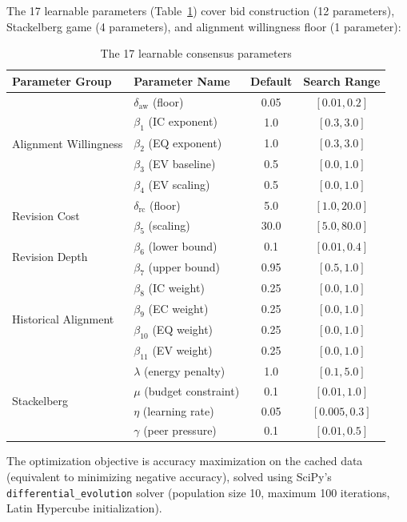 \documentclass[12pt,a4paper]{article}
\begin{document}
The 17 learnable parameters (Table~\ref{tab:params}) cover bid construction (12 parameters), Stackelberg game (4 parameters), and alignment willingness floor (1 parameter):

\begin{table}[H]
\centering
\caption{The 17 learnable consensus parameters}\label{tab:params}
\begin{tabular}{llcc}
\toprule
Parameter Group & Parameter Name & Default & Search Range \\
\midrule
\multirow{5}{*}{Alignment Willingness} & $\delta_{\text{aw}}$ (floor) & 0.05 & $[0.01, 0.2]$ \\
& $\beta_1$ (IC exponent) & 1.0 & $[0.3, 3.0]$ \\
& $\beta_2$ (EQ exponent) & 1.0 & $[0.3, 3.0]$ \\
& $\beta_3$ (EV baseline) & 0.5 & $[0.0, 1.0]$ \\
& $\beta_4$ (EV scaling) & 0.5 & $[0.0, 1.0]$ \\
\midrule
\multirow{2}{*}{Revision Cost} & $\delta_{\text{rc}}$ (floor) & 5.0 & $[1.0, 20.0]$ \\
& $\beta_5$ (scaling) & 30.0 & $[5.0, 80.0]$ \\
\midrule
\multirow{2}{*}{Revision Depth} & $\beta_6$ (lower bound) & 0.1 & $[0.01, 0.4]$ \\
& $\beta_7$ (upper bound) & 0.95 & $[0.5, 1.0]$ \\
\midrule
\multirow{4}{*}{Historical Alignment} & $\beta_8$ (IC weight) & 0.25 & $[0.0, 1.0]$ \\
& $\beta_9$ (EC weight) & 0.25 & $[0.0, 1.0]$ \\
& $\beta_{10}$ (EQ weight) & 0.25 & $[0.0, 1.0]$ \\
& $\beta_{11}$ (EV weight) & 0.25 & $[0.0, 1.0]$ \\
\midrule
\multirow{4}{*}{Stackelberg} & $\lambda$ (energy penalty) & 1.0 & $[0.1, 5.0]$ \\
& $\mu$ (budget constraint) & 0.1 & $[0.01, 1.0]$ \\
& $\eta$ (learning rate) & 0.05 & $[0.005, 0.3]$ \\
& $\gamma$ (peer pressure) & 0.1 & $[0.01, 0.5]$ \\
\bottomrule
\end{tabular}
\end{table}

The optimization objective is accuracy maximization on the cached data (equivalent to minimizing negative accuracy), solved using SciPy's \texttt{differential\_evolution} solver (population size 10, maximum 100 iterations, Latin Hypercube initialization).
\end{document}
